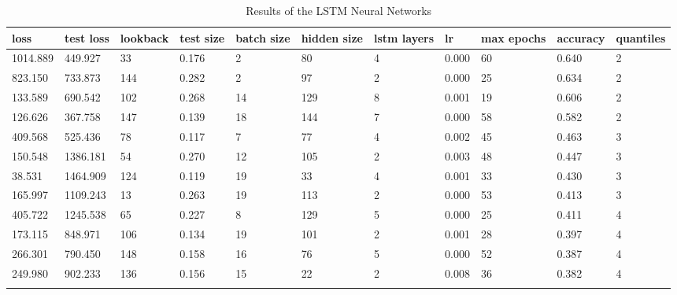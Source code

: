 \documentclass[sn-mathphys-num]{sn-jnl}
\begin{document}
\begin{table}
    \caption{Results of the LSTM Neural Networks}\label{tab2}
    \begin{tabular}{@{}lllllllllll@{}}
        \toprule%
        loss     & test loss & lookback & test size & batch size & hidden size & lstm layers & lr    & max epochs & accuracy & quantiles \\
        \midrule
        1014.889 & 449.927   & 33       & 0.176     & 2          & 80          & 4           & 0.000 & 60         & 0.640    & 2         \\
        823.150  & 733.873   & 144      & 0.282     & 2          & 97          & 2           & 0.000 & 25         & 0.634    & 2         \\
        133.589  & 690.542   & 102      & 0.268     & 14         & 129         & 8           & 0.001 & 19         & 0.606    & 2         \\
        126.626  & 367.758   & 147      & 0.139     & 18         & 144         & 7           & 0.000 & 58         & 0.582    & 2         \\
        \midrule
        409.568  & 525.436   & 78       & 0.117     & 7          & 77          & 4           & 0.002 & 45         & 0.463    & 3         \\
        150.548  & 1386.181  & 54       & 0.270     & 12         & 105         & 2           & 0.003 & 48         & 0.447    & 3         \\
        38.531   & 1464.909  & 124      & 0.119     & 19         & 33          & 4           & 0.001 & 33         & 0.430    & 3         \\
        165.997  & 1109.243  & 13       & 0.263     & 19         & 113         & 2           & 0.000 & 53         & 0.413    & 3         \\
        \midrule
        405.722  & 1245.538  & 65       & 0.227     & 8          & 129         & 5           & 0.000 & 25         & 0.411    & 4         \\
        173.115  & 848.971   & 106      & 0.134     & 19         & 101         & 2           & 0.001 & 28         & 0.397    & 4         \\
        266.301  & 790.450   & 148      & 0.158     & 16         & 76          & 5           & 0.000 & 52         & 0.387    & 4         \\
        249.980  & 902.233   & 136      & 0.156     & 15         & 22          & 2           & 0.008 & 36         & 0.382    & 4         \\
        \botrule
    \end{tabular}
\end{table}
\unskip
\end{document}
